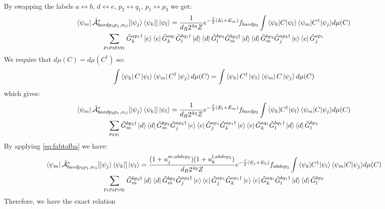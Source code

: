 \documentclass[aps,floatfix,10pt,amssymb,amsfont,amsmath,superscriptaddress,float,nofootinbib,longbibliography,nobalancelastpage,twocolumn]{revtex4-2}
\begin{document}
\begin{widetext}
\begin{multline}
\end{multline}
By swapping the labels $a \leftrightarrow b$, $d \leftrightarrow e$, $p_2 \leftrightarrow q_1$, $p_1 \leftrightarrow p_3$ we get:
\begin{multline}
   \bra{\psi_m}\tilde{\mathcal{A}}^*_{baedp_3p_1,\sigma_G}[\ket{\psi_j}\bra{\psi_k}]\ket{\psi_l}  =\frac{1}{d_R2^{4\eta}Z} e^{-\frac{\beta}{2}(E_l+E_m)}{f_{baedp_3}} \int {\braket{\psi_k|C|\psi_l}\braket{\psi_m|C^{\dagger}|\psi_j}} d\mu(C)\\\sum_{p_1p_2p_3q_1} {\tilde G^{ap_1\dagger}_k\ket{e}\bra{e}\tilde G^{aq_1}_k} {\tilde G_l^{bq_1\dagger}\ket{d}\bra{d}\tilde G_l^{bp_3}\tilde G_m^{bp_3\dagger}\ket{d}\bra{d}\tilde G_m^{bp_2}} {\tilde G^{ap_2\dagger}_j\ket{e}\bra{e}\tilde G^{ap_1}_j } 
\end{multline}
We require that $d\mu(C) = d\mu(C^{\dagger})$ so:
\begin{equation}
    \int  \bra{\psi_k}C\ket{\psi_{l}}\bra{\psi_m}C^{\dagger} \ket{\psi_j} d\mu(C) = \int  \bra{\psi_k}C^{\dagger}\ket{\psi_{l}}\bra{\psi_m}C \ket{\psi_j} d\mu(C)
\end{equation}
which gives:
\begin{multline}
   \bra{\psi_m}\tilde{\mathcal{A}}^*_{baedp_3p_1,\sigma_G}[\ket{\psi_j}\bra{\psi_k}]\ket{\psi_l}  =\frac{1}{d_R2^{4\eta}Z}  e^{-\frac{\beta}{2}(E_l+E_m)}{f_{baedp_3}}  \int {\braket{\psi_k|C^{\dagger}|\psi_l}\braket{\psi_m|C|\psi_j}} d\mu(C)\\\sum_{p_2q_1} \tilde G_m^{bp_3\dagger} \ket{d}\bra{d}\tilde G_m^{bp_2} {\tilde G^{ap_2\dagger}_j\ket{e}\bra{e}\tilde G^{ap_1}_j } {\tilde G^{ap_1\dagger}_k\ket{e}\bra{e}\tilde G^{aq_1}_k} \tilde G_l^{bq_1\dagger}\ket{d}\bra{d}\tilde G_l^{bp_3} 
\end{multline}
By applying \eqref{eq:fabtofba} we have:
\begin{multline}
   \bra{\psi_m}\tilde{\mathcal{A}}^*_{baedp_3p_1,\sigma_G}[\ket{\psi_j}\bra{\psi_k}]\ket{\psi_l}  =\frac{(1+u_j^{m,abdep_3})(1+u_k^{l,abdep_3})}{d_R2^{4\eta}Z} e^{-\frac{\beta}{2}(E_j+E_k)}{f_{abdep_3}} \int {\braket{\psi_k|C^{\dagger}|\psi_l}\braket{\psi_m|C|\psi_j}} d\mu(C)\\\sum_{p_1p_2p_3q_1} \tilde G_m^{bp_3\dagger} \ket{d}\bra{d}\tilde G_m^{bp_2} {\tilde G^{ap_2\dagger}_j\ket{e}\bra{e}\tilde G^{ap_1}_j } {\tilde G^{ap_1\dagger}_k\ket{e}\bra{e}\tilde G^{aq_1}_k} \tilde G_l^{bq_1\dagger}\ket{d}\bra{d}\tilde G_l^{bp_3}
\end{multline}
Therefore, we have the exact relation
\begin{equation}

\end{equation}
\end{widetext}
\end{document}
